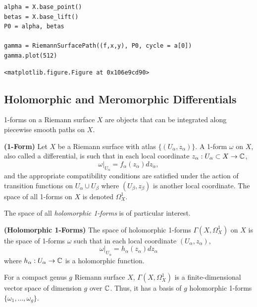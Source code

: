 \begin{lstlisting}
alpha = X.base_point()
betas = X.base_lift()
P0 = alpha, betas

gamma = RiemannSurfacePath((f,x,y), P0, cycle = a[0])
gamma.plot(512)
\end{lstlisting}
\begin{lstlisting}
<matplotlib.figure.Figure at 0x106e9cd90>
\end{lstlisting}
\begin{center}
\end{center}


\subsection{Holomorphic and Meromorphic
  Differentials}\label{subsec:background-holomorphic-and-meromorphic-differentials}

1-forms on a Riemann surface $X$ are objects that can be integrated along
piecewise smooth paths on $X$.
\begin{definition}
  {\bf (1-Form)} Let $X$ be a Riemann surface with atlas $\{ (U_\alpha,
  z_\alpha) \}$. A 1-form $\omega$ on $X$, also called a differential, is such
  that in each local coordinate $z_\alpha : U_\alpha \subset X \to \operatorname{\mathbb{C}}$,
  \[
    \omega \Big|_{U_\alpha} = f_\alpha(z_\alpha) dz_\alpha,
  \]
  and the appropriate compatibility conditions are satisfied under the action of
  transition functions on $U_\alpha \cup U_\beta$ where $(U_\beta, z_\beta)$ is
  another local coordinate. The space of all 1-forms on $X$ is denoted
  $\Omega_X^1$.
\end{definition}
The space of all {\it holomorphic 1-forms} is of particular interest.
\begin{definition}
  {\bf (Holomorphic 1-Forms)} The space of holomorphic 1-forms
  $\Gamma(X,\Omega_X^1)$ on $X$ is the space of 1-forms $\omega$ such that in
  each local coordinate $(U_\alpha, z_\alpha)$,
  \[
    \omega \Big|_{U_\alpha} = h_\alpha(z_\alpha) dz_\alpha
  \]
  where $h_\alpha : U_\alpha \to \operatorname{\mathbb{C}}$ is a holomorphic function.
\end{definition}
For a compact genus $g$ Riemann surface $X$, $\Gamma(X,\Omega_X^1)$ is a
finite-dimensional vector space of dimension $g$ over $\operatorname{\mathbb{C}}$. Thus, it has a
basis of $g$ holomorphic 1-forms $\{\omega_1, \ldots, \omega_g\}$.

